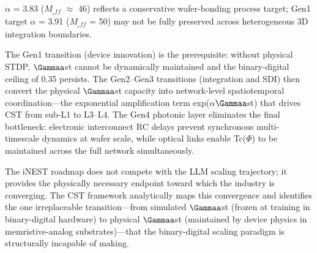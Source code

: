 \documentclass[a4paper,12pt]{article}
\begin{document}
 $\alpha$ = 3.83 ($M_{_eff}$ $\approx$ 46) reflects a conservative wafer-bonding process target; Gen1 target $\alpha$ = 3.91 ($M_{_eff}$ = 50) may not be fully preserved across heterogeneous 3D integration boundaries.


The Gen1 transition (device innovation) is the prerequisite: without physical STDP, $\Gammaa$st cannot be dynamically maintained and the binary-digital ceiling of 0.35 persists. The Gen2--Gen3 transitions (integration and SDI) then convert the physical $\Gammaa$st capacity into network-level spatiotemporal coordination---the exponential amplification term exp($\alpha$\cdot$\Gammaa$st) that drives CST from sub-L1 to L3--L4. The Gen4 photonic layer eliminates the final bottleneck: electronic interconnect RC delays prevent synchronous multi-timescale dynamics at wafer scale, while optical links enable Tc($\Phi$) to be maintained across the full network simultaneously.


The iNEST roadmap does not compete with the LLM scaling trajectory; it provides the physically necessary endpoint toward which the industry is converging. The CST framework analytically maps this convergence and identifies the one irreplaceable transition---from simulated $\Gammaa$st (frozen at training in binary-digital hardware) to physical $\Gammaa$st (maintained by device physics in memristive-analog substrates)---that the binary-digital scaling paradigm is structurally incapable of making.
\end{document}
